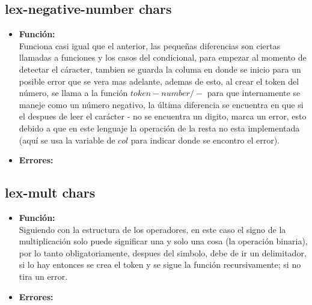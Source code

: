 \documentclass{article}
\begin{document}
\subsection{lex-negative-number chars}
\begin{itemize}
    \item \textbf{Función:} \\
    Funciona casi igual que el anterior, las pequeñas diferencias son ciertas llamadas a funciones y los casos del condicional, para empezar al momento de detectar el cáracter, tambien se guarda la columa en donde se inicio para un posible error que se vera mas adelante, ademas de esto, al crear el token del número, se llama a la función $token-number/-$ para que internamente se maneje como un número negativo, la última diferencia se encuentra en que si el despues de leer el carácter - no se encuentra un digito, marca un error, esto debido a que en este lenguaje la operación de la resta no esta implementada (aquí se usa la variable de $col$ para indicar donde se encontro el error).
    \item \textbf{Errores:} \\ 
\end{itemize}
\subsection{lex-mult chars}
\begin{itemize}
    \item \textbf{Función:} \\
    Siguiendo con la estructura de los operadores, en este caso el signo de la multiplicación solo puede significar una y solo una cosa (la operación binaria), por lo tanto obligatoriamente, despues del simbolo, debe de ir un delimitador, si lo hay entonces se crea el token y se sigue la función recursivamente; si no tira un error.
    \item \textbf{Errores:} \\ 
\end{itemize}
\end{document}
